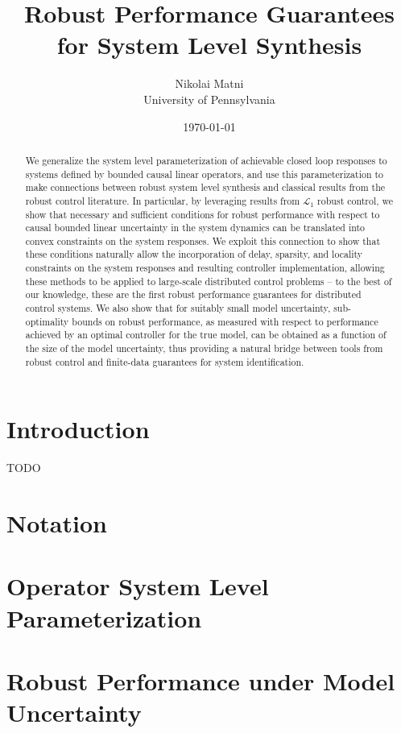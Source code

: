 \documentclass[11pt]{article}
\title{Robust Performance Guarantees for System Level Synthesis}
\author{Nikolai Matni
\vspace{0.0625in}
\\
University of Pennsylvania}
\date{\today}
\numberwithin{theorem}{section}
\numberwithin{equation}{section}
\begin{document}
\maketitle
\begin{abstract}
We generalize the system level parameterization of achievable closed loop responses to systems defined by bounded causal linear operators, and use this parameterization to make connections between robust system level synthesis and classical results from the robust control literature.  In particular, by leveraging results from $\mathcal{L}_1$ robust control, we show that necessary and sufficient conditions for robust performance with respect to causal bounded linear uncertainty in the system dynamics can be translated into convex constraints on the system responses.  We exploit this connection to show that these conditions naturally allow the incorporation of delay, sparsity, and locality constraints on the system responses and resulting controller implementation, allowing these methods to be applied to large-scale distributed control problems -- to the best of our knowledge, these are the first robust performance guarantees for distributed control systems.  We also show that for suitably small model uncertainty, sub-optimality bounds on robust performance, as measured with respect to performance achieved by an optimal controller for the true model, can be obtained as a function of the size of the model uncertainty, thus providing a natural bridge between tools from robust control and finite-data guarantees for system identification.
\end{abstract}

\section{Introduction}
TODO

\section{Notation}


\section{Operator System Level Parameterization}


\section{Robust Performance under Model Uncertainty}


\begin{small}
  
 
\end{small} 
\end{document}
